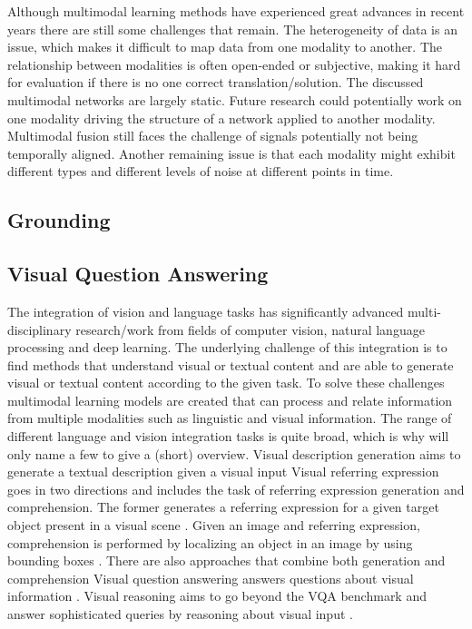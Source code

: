 \documentclass{article}
\begin{document}
Although multimodal learning methods have experienced great advances in recent years there are still some challenges that remain. The heterogeneity of data is an issue, which makes it difficult to map data from one modality to another. The relationship between modalities is often open-ended or subjective, making it hard for evaluation if there is no one correct translation/solution. The discussed multimodal networks are largely static. Future research could potentially work on one modality driving the structure of a network applied to another modality. Multimodal fusion still faces the challenge of signals potentially not being temporally aligned. Another remaining issue is that each modality might exhibit different types and different levels of noise at different points in time.

\subsection{Grounding}

\subsection{Visual Question Answering} \label{vqa}

The integration of vision and language tasks has significantly advanced multi-disciplinary research/work from fields of computer vision, natural language processing and deep learning. The underlying challenge of this integration is to find methods that understand visual or textual content and are able to generate visual or textual content according to the given task. To solve these challenges multimodal learning models are created that can process and relate information from multiple modalities such as linguistic and visual information. The range of different language and vision integration tasks is quite broad, which is why will only name a few to give a (short) overview. Visual description generation aims to generate a textual description given a visual input \citep{plummer2015vdg} Visual referring expression goes in two directions and includes the task of referring expression generation and comprehension. The former generates a referring expression for a given target object present in a visual scene \citep{fitzgerald2013learning}. Given an image and referring expression, comprehension is performed by localizing an object in an image by using bounding boxes \citep{nagaraja2016modeling}. There are also approaches that combine both generation and comprehension \citep{yu2016modeling} Visual question answering answers questions about visual information \citep{antol2015vqa}. Visual reasoning aims to go beyond the VQA benchmark and answer sophisticated queries by reasoning about visual input \citep{johnson2017clevr}.
\end{document}
